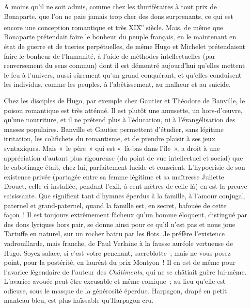 \documentclass[french,twoside]{book} %
\begin{document}
A moins qu’il ne soit admis, comme chez les thuriféraires à tout prix de Bonaparte, que l’on ne paie jamais trop cher des dons surprenants, ce qui est encore une conception romantique et très XIX\textsuperscript{e} siècle. Mais, de même que Bonaparte prétendait faire le bonheur du peuple français, en le maintenant en état de guerre et de tueries perpétuelles, de même Hugo et Michelet prétendaient faire le bonheur de l’humanité, à l’aide de méthodes intellectuelles (par renversement du sens commun) dont il est démontré aujourd’hui qu’elles mettent le feu à l’univers, aussi sûrement qu’un grand conquérant, et qu’elles conduisent les individus, comme les peuples, à l’abêtissement, au malheur et au suicide.\par
Chez les disciples de Hugo, par exemple chez Gautier et Théodore de Banville, le poison romantique est très atténué. Il est plutôt une amusette, un hors-d’œuvre, qu’une nourriture, et il ne prétend plus à l’éducation, ni à l’évangélisation des masses populaires. Banville et Gautier permettent d’étudier, sans légitime irritation, les colifichets du romantisme, et de prendre plaisir à ses jeux syntaxiques. Mais « le père » qui est « là-bas dans l’île », a droit à une appréciation d’autant plus rigoureuse (du point de vue intellectuel et social) que le cabotinage était, chez lui, parfaitement lucide et conscient. L’hypocrisie de son existence privée (partagée entre sa femme légitime et sa maîtresse Juliette Drouet, celle-ci installée, pendant l’exil, à cent mètres de celle-là) en est la preuve saisissante. Que signifient tant d’hymnes éperdus à la famille, à l’amour conjugal, paternel et grand-paternel, quand la famille est, en secret, bafouée de cette façon ! Il est toujours extrêmement fâcheux qu’un homme éloquent, distingué par des dons lyriques hors pair, se donne ainsi pour ce qu’il n’est pas et nous joue Tartuffe en naturel, sur un rocher battu par les flots. Je préfère l’existence vadrouillarde, mais franche, de Paul Verlaine à la fausse auréole vertueuse de Hugo. Soyez salace, si c’est votre penchant, sacreblotte ; mais ne vous posez point, pour la postérité, en lauréat du prix Montyon ! Il en est de même pour l’avarice légendaire de l’auteur des {\itshape Châtiments}, qui ne se châtiait guère lui-même. L’avarice avouée peut être excusable et même comique ; au lieu qu’elle est odieuse, sous le masque de la générosité éperdue. Harpagon, drapé en petit manteau bleu, est plus haïssable qu’Harpagon cru.\par
\end{document}
